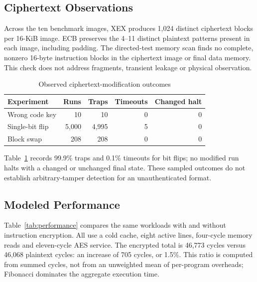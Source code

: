 \documentclass[conference,a4paper]{IEEEtran}
\begin{document}
\subsection{Ciphertext Observations}
Across the ten benchmark images, XEX produces 1,024 distinct ciphertext blocks
per 16-KiB image. ECB preserves the 4--11 distinct plaintext patterns present
in each image, including padding. The directed-test memory scan finds no
complete, nonzero 16-byte instruction blocks in the ciphertext image or final
data memory. This check does not address fragments, transient leakage or
physical observation.

\begin{table}[t]
\caption{Observed ciphertext-modification outcomes}
\label{tab:tamper}
\centering
\small
\begin{tabular}{@{}lrrrr@{}}
\toprule
Experiment & Runs & Traps & Timeouts & Changed halt \\
\midrule
Wrong code key & 10 & 10 & 0 & 0 \\
Single-bit flip & 5,000 & 4,995 & 5 & 0 \\
Block swap & 208 & 208 & 0 & 0 \\
\bottomrule
\end{tabular}
\end{table}

Table~\ref{tab:tamper} records 99.9\% traps and 0.1\% timeouts for bit flips;
no modified run halts with a changed or unchanged final state. These sampled
outcomes do not establish arbitrary-tamper detection for an unauthenticated
format.

\balance
\subsection{Modeled Performance}
Table~\ref{tab:performance} compares the same workloads with and without
instruction encryption. All use a cold cache, eight active lines, four-cycle
memory reads and eleven-cycle AES service. The encrypted total is 46,773
cycles versus 46,068 plaintext cycles: an increase of 705 cycles, or 1.5\%.
This ratio is computed from summed cycles, not from an unweighted mean of
per-program overheads; Fibonacci dominates the aggregate execution time.
\end{document}
